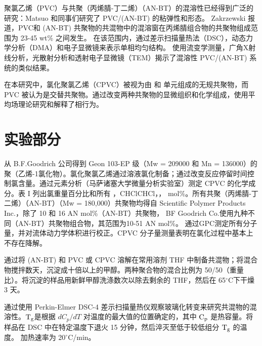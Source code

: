 \documentclass[a4paper,transmag,12pt]{IEEEtran}    %
\newcommand{\cdegree}{$^{\circ}$C}  %
\begin{document}
聚氯乙烯（PVC）与共聚（丙烯腈-丁二烯）（AN-BT）的混溶性已经得到广泛的研究：Matsuo 和同事们研究了 PVC/(AN-BT) 的粘弹性和形态。 Zakrzewski 报道，PVC和 (AN-BT) 共聚物的共混物中的混溶窗在丙烯腈组合物的共聚物组成范围为 23-45 wt\% 之间发生。 在该范围内，通过差示扫描量热法（DSC），动态力学分析（DMA）和电子显微镜来表示单相均匀结构。 使用流变学测量，广角X射线分析，光散射分析和透射电子显微镜（TEM）揭示了混溶性 PVC/(AN-BT) 系统的类似结果。\par{}
在本研究中，氯化聚氯乙烯（CPVC）被视为由  和  单元组成的无规共聚物，而 PVC 被认为是交替共聚物。通过改变两种共聚物的显微组织和化学组成，使用平均场理论研究和解释了相行为。

\section{实验部分}
从 B.F.Goodrich 公司得到 Geon 103-EP 级（Mw = 209000 和 Mn = 136000）的聚（乙烯-1氯化物）。氯化聚氯乙烯通过溶液氯化制备；通过改变反应停留时间控制氯含量。通过元素分析（马萨诸塞大学微量分析实验室）测定 CPVC 的化学成分。表 I 列出氯重量百分比和所有 ，CHClCHCl，， mol\%。所有共聚（丙烯腈-丁二烯）（AN-BT）（Mw = 180,000）共聚物均得自 Scientific Polymer Products Inc.，除了 10 和 16 AN mol\%（AN-BT）共聚物， BF Goodrich Co.使用九种不同（AN-BT）共聚物组合物，其范围为10-51 AN mol\%。 通过GPC测定所有分子量，并对流体动力学体积进行校正。CPVC 分子量测量表明在氯化过程中基本上不存在降解。\par{}
通过将 (AN-BT) 和 PVC 或 CPVC 溶解在常用溶剂 THF 中制备共混物；将混合物搅拌数天，沉淀成十倍以上的甲醇。两种聚合物的混合比例为 50/50（重量比）。将沉淀的样品用新鲜甲醇洗涤数次以除去剩余的 THF，然后在 65\cdegree 下干燥 3 天。\par{}
通过使用 Perkin-Elmer DSC-4 差示扫描量热仪观察玻璃化转变来研究共混物的混溶性。$\rm{T_g}$是根据 $dC_p/dT$ 对温度的最大值的位置确定的，其中 $\rm{C_p}$ 是热容量。将样品在 DSC 中在特定温度下退火 15 分钟，然后淬灭至低于较低组分 $\rm{T_g}$ 的温度。 加热速率为 20\cdegree/min。
\end{document}
